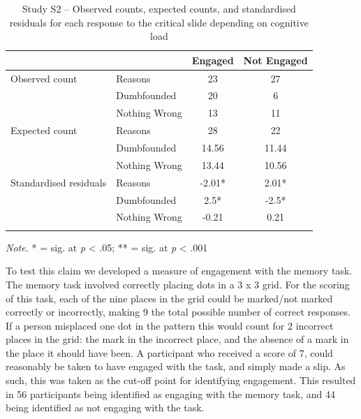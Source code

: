 \documentclass[
  man,floatsintext]{apa6}
\begin{document}
\begin{table}[tbp]

\begin{center}
\begin{threeparttable}

\caption{\label{tab:S2S2tab1dumb}Study S2 – Observed counts, expected counts, and standardised residuals for each response to the critical slide depending on cognitive load}

\begin{tabular}{llcc}
\toprule
 & \multicolumn{1}{c}{} & \multicolumn{1}{c}{Engaged} & \multicolumn{1}{c}{Not Engaged}\\
\midrule
Observed count & Reasons & 23 & 27\\
 & Dumbfounded & 20 & 6\\
 & Nothing Wrong & 13 & 11\\
Expected count & Reasons & 28 & 22\\
 & Dumbfounded & 14.56 & 11.44\\
 & Nothing Wrong & 13.44 & 10.56\\
Standardised residuals & Reasons & -2.01* & 2.01*\\
 & Dumbfounded & 2.5* & -2.5*\\
 & Nothing Wrong & -0.21 & 0.21\\
\bottomrule
\addlinespace
\end{tabular}

\begin{tablenotes}[para]
\normalsize{\textit{Note.} * = sig. at \emph{p} < .05; ** = sig. at \emph{p} < .001}
\end{tablenotes}

\end{threeparttable}
\end{center}

\end{table}

To test this claim we developed a measure of engagement with the memory task. The memory task involved correctly placing dots in a 3 x 3 grid. For the scoring of this task, each of the nine places in the grid could be marked/not marked correctly or incorrectly, making 9 the total possible number of correct responses. If a person misplaced one dot in the pattern this would count for 2 incorrect places in the grid: the mark in the incorrect place, and the absence of a mark in the place it should have been. A participant who received a score of 7, could reasonably be taken to have engaged with the task, and simply made a slip. As such, this was taken as the cut-off point for identifying engagement. This resulted in 56 participants being identified as engaging with the memory task, and 44 being identified as not engaging with the task.
\end{document}
